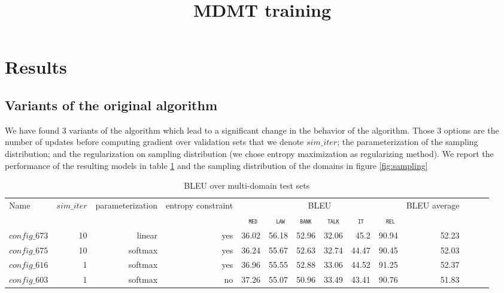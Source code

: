 \documentclass[12pt,times,a4paper,twoside]{article}
\title{MDMT training}
\author{}
\date{}
\newcommand{\domain}[1]{\texttt{\textsc{#1}}}
\newcommand{\system}[1]{\texttt{{#1}}}
\theoremstyle{definition}
\begin{document}
\maketitle

\section{Results}
\subsection{Variants of the original algorithm}
We have found 3 variants of the algorithm which lead to a significant change in the behavior of the algorithm. Those 3 options are the number of updates before computing gradient over validation sets that we denote $sim\_iter$; the parameterization of the sampling distribution; and the regularization on sampling distribution (we chose entropy maximization as regularizing method). We report the performance of the resulting models in table \ref{tab:performance} and the sampling distribution of the domains in figure \ref{fig:sampling}

\begin{table}
  \centering%
  \begin{adjustbox}{width=1.0\columnwidth,center}
  \begin{tabular}{|p{3.0cm}|*{13}{r|}} \hline
    \multirow{2}{*}{Name} & \multirow{2}{*}{$sim\_iter$} & \multirow{2}{*}{parameterization} & \multirow{2}{*}{entropy constraint} & \multicolumn{6}{|c|}{BLEU} & \multirow{2}{*}{BLEU average} \\ \cline{5-10}	
   & & & & \multicolumn{1}{c|}{\domain{ med}} & \multicolumn{1}{c|}{\domain{ law}} & \multicolumn{1}{c|}{\domain{bank}} & \multicolumn{1}{c|}{\domain{talk}} & \multicolumn{1}{c|}{\domain{ it }} & \multicolumn{1}{c|}{\domain{ rel}} &  \\
    \hline
  \system{$config\_673$} & 10 & linear & yes & 36.02& 56.18& 52.96& 32.06& 45.2 & 90.94 & 52.23 \\
  \system{$config\_675$} & 10 & softmax & yes & 36.24& 55.67& 52.63& 32.74& 44.47& 90.45& 52.03\\
  \system{$config\_616$} & 1 & softmax & yes & 36.96& 55.55& 52.88& 33.06& 44.52& 91.25& 52.37 \\
  \system{$config\_603$} & 1 & softmax & no & 37.26& 55.07& 50.96& 33.49& 43.41& 90.76& 51.83\\
  \hline
  \end{tabular}
  \end{adjustbox}
  \caption{BLEU over multi-domain test sets}
  \label{tab:performance}
\end{table}
\end{document}
